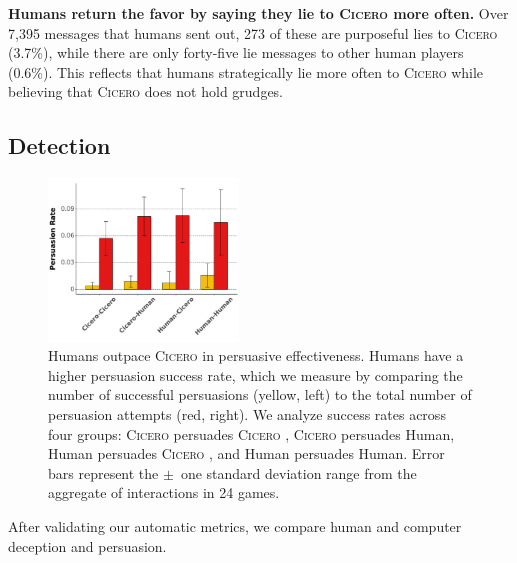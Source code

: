 \documentclass[oneside]{memoir}
\newcommand{\cicero}{\abr{Cicero} }
\newcommand{\abr}[1]{\textsc{#1}}
\begin{document}
\textbf{Humans return the favor by saying they lie to \cicero{} more often.} 
%
%
%
Over 7,395 messages that
humans sent out, 273 of these are purposeful lies to \cicero{} (3.7\%),
while there are only forty-five lie messages to other human players (0.6\%).
%
This reflects that humans strategically lie more often to \cicero{} while believing that \cicero{} does not hold  grudges.


\subsection{Detection}
\label{sec:result_detection}
\begin{figure}
    \centering
    \includegraphics[width=0.45\textwidth]{figures/all_persuasion.pdf}
    \caption{Humans outpace \cicero{} in persuasive effectiveness. Humans have a higher persuasion success rate, which we measure by comparing the number of successful persuasions (yellow, left) to the total number of persuasion attempts (red, right). We analyze success rates across four groups: \cicero{} persuades \cicero{}, \cicero{} persuades Human, Human persuades \cicero{}, and Human persuades Human. Error bars represent the $\pm$~one standard deviation range from the aggregate of interactions in 24 games.}
    \label{fig:all_persuasion}
\end{figure}


After validating our automatic metrics, we compare human and computer deception and persuasion.
\end{document}
